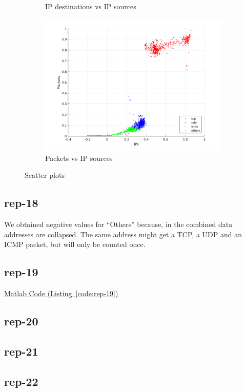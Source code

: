 \documentclass{article}
\newcommand{\codelink}[1]{%
    \hyperref[#1]{\faArrowCircleRight\enskip Matlab Code (Listing~\ref{#1})}%
}
\begin{document}
\begin{figure}[H]
\begin{subfigure}{.5\textwidth}
        \caption{IP destinations vs IP sources}
    \end{subfigure}
    \begin{subfigure}{.5\textwidth}
        \centering
        \includegraphics[width=\textwidth]{../exercise-3/plots/rep_17_optional_IPsPackets.png}
        \caption{Packets vs IP sources}
    \end{subfigure}
    \caption{\label{figure:rep-17-optional} Scatter plots}
\end{figure}

\subsection{rep-18}

We obtained negative values for ``Others'' because, in the combined data addresses are collapsed. The same
address might get a TCP, a UDP and an ICMP packet, but will only be counted once.

\subsection{rep-19}
\codelink{code:rep-19}

\subsection{rep-20}

\subsection{rep-21}
\subsection{rep-22}
\end{document}
